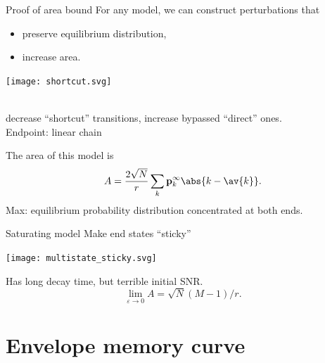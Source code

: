 \documentclass{beamer}%
\newcommand{\pr}{\mathbf{p}}
\newcommand{\eq}{\pr^\infty}
\begin{document}
\begin{frame}[label=fr_areaproof]{Proof of area bound}
%
 For any model, we can construct perturbations that
 \parbox[c]{5cm}{
  \begin{itemize}
    \item preserve equilibrium distribution,
    \item increase area.
  \end{itemize}
  \hyperlink{fr_tech}{}
 }
 \parbox[c]{5cm}{
  \begin{center}
    \texttt{[image: shortcut.svg]}
  \end{center}
 }\\
 \eg decrease ``shortcut'' transitions, increase bypassed ``direct'' ones.\\
 Endpoint: linear chain

 \vp The area of this model is
 \begin{equation*}
   A = \frac{2\sqrt{N}}{r}\sum_k \eq_k \abs{k-\av{k}}.
 \end{equation*}
 \note[item]{max given $\eq$}
 \note[item]{now max \wrt $\eq$}
 Max: equilibrium probability distribution concentrated at both ends.
 \\
%
\end{frame}


\begin{frame}{Saturating model}
%
 Make end states ``sticky''
 \begin{center}
   \texttt{[image: multistate\_sticky.svg]}
 \end{center}
 Has long decay time, but terrible initial SNR.
 \begin{equation*}
   \lim_{\varepsilon\to0}A=\sqrt{N}(M-1)/r.
 \end{equation*}
%
\end{frame}



\section{Envelope memory curve}
\end{document}
